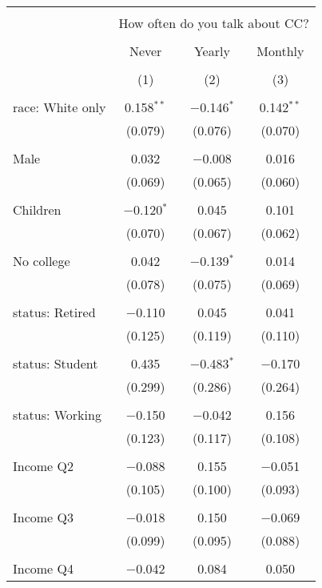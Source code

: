 
\begin{tabular}{@{\extracolsep{5pt}}lccc} 
\\[-1.8ex]\hline 
\hline \\[-1.8ex] 
 & \multicolumn{3}{c}{How often do you talk about CC?} \\ 
\cline{2-4} 
\\[-1.8ex] & Never & Yearly & Monthly \\ 
\\[-1.8ex] & (1) & (2) & (3)\\ 
\hline \\[-1.8ex] 
 race: White only & 0.158$^{**}$ & $-$0.146$^{*}$ & 0.142$^{**}$ \\ 
  & (0.079) & (0.076) & (0.070) \\ 
  & & & \\ 
 Male & 0.032 & $-$0.008 & 0.016 \\ 
  & (0.069) & (0.065) & (0.060) \\ 
  & & & \\ 
 Children & $-$0.120$^{*}$ & 0.045 & 0.101 \\ 
  & (0.070) & (0.067) & (0.062) \\ 
  & & & \\ 
 No college & 0.042 & $-$0.139$^{*}$ & 0.014 \\ 
  & (0.078) & (0.075) & (0.069) \\ 
  & & & \\ 
 status: Retired & $-$0.110 & 0.045 & 0.041 \\ 
  & (0.125) & (0.119) & (0.110) \\ 
  & & & \\ 
 status: Student & 0.435 & $-$0.483$^{*}$ & $-$0.170 \\ 
  & (0.299) & (0.286) & (0.264) \\ 
  & & & \\ 
 status: Working & $-$0.150 & $-$0.042 & 0.156 \\ 
  & (0.123) & (0.117) & (0.108) \\ 
  & & & \\ 
 Income Q2 & $-$0.088 & 0.155 & $-$0.051 \\ 
  & (0.105) & (0.100) & (0.093) \\ 
  & & & \\ 
 Income Q3 & $-$0.018 & 0.150 & $-$0.069 \\ 
  & (0.099) & (0.095) & (0.088) \\ 
  & & & \\ 
 Income Q4 & $-$0.042 & 0.084 & 0.050 \\ 

\end{tabular}
